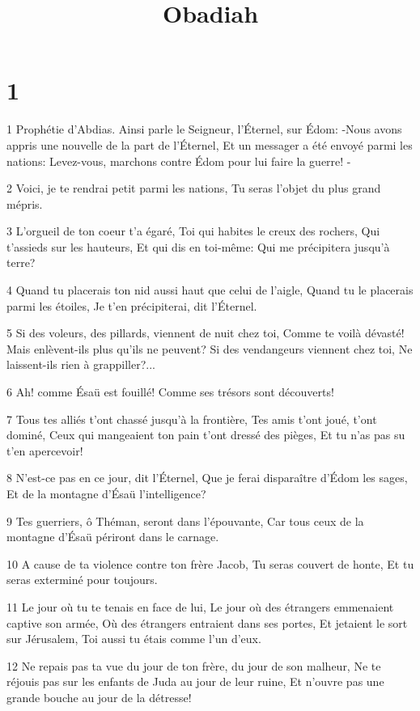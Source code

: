 

\title{Obadiah}


\chapter{1}

\par 1 Prophétie d'Abdias. Ainsi parle le Seigneur, l'Éternel, sur Édom: -Nous avons appris une nouvelle de la part de l'Éternel, Et un messager a été envoyé parmi les nations: Levez-vous, marchons contre Édom pour lui faire la guerre! -
\par 2 Voici, je te rendrai petit parmi les nations, Tu seras l'objet du plus grand mépris.
\par 3 L'orgueil de ton coeur t'a égaré, Toi qui habites le creux des rochers, Qui t'assieds sur les hauteurs, Et qui dis en toi-même: Qui me précipitera jusqu'à terre?
\par 4 Quand tu placerais ton nid aussi haut que celui de l'aigle, Quand tu le placerais parmi les étoiles, Je t'en précipiterai, dit l'Éternel.
\par 5 Si des voleurs, des pillards, viennent de nuit chez toi, Comme te voilà dévasté! Mais enlèvent-ils plus qu'ils ne peuvent? Si des vendangeurs viennent chez toi, Ne laissent-ils rien à grappiller?...
\par 6 Ah! comme Ésaü est fouillé! Comme ses trésors sont découverts!
\par 7 Tous tes alliés t'ont chassé jusqu'à la frontière, Tes amis t'ont joué, t'ont dominé, Ceux qui mangeaient ton pain t'ont dressé des pièges, Et tu n'as pas su t'en apercevoir!
\par 8 N'est-ce pas en ce jour, dit l'Éternel, Que je ferai disparaître d'Édom les sages, Et de la montagne d'Ésaü l'intelligence?
\par 9 Tes guerriers, ô Théman, seront dans l'épouvante, Car tous ceux de la montagne d'Ésaü périront dans le carnage.
\par 10 A cause de ta violence contre ton frère Jacob, Tu seras couvert de honte, Et tu seras exterminé pour toujours.
\par 11 Le jour où tu te tenais en face de lui, Le jour où des étrangers emmenaient captive son armée, Où des étrangers entraient dans ses portes, Et jetaient le sort sur Jérusalem, Toi aussi tu étais comme l'un d'eux.
\par 12 Ne repais pas ta vue du jour de ton frère, du jour de son malheur, Ne te réjouis pas sur les enfants de Juda au jour de leur ruine, Et n'ouvre pas une grande bouche au jour de la détresse!
